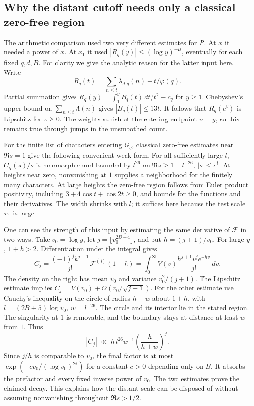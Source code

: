 \subsection{Why the distant cutoff needs only a classical zero-free region}
The arithmetic comparison used two very different estimates for \(R\). At \(x\) it needed a power of \(x\). At \(x_1\) it used \(|R_q(y)|\le(\log y)^{-B}\), eventually for each fixed \(q,d,B\). For clarity we give the analytic reason for the latter input here. Write
\[
  B_q(t)=\sum_{n\le t}\lambda_{d,q}(n)-t/\varphi(q).
\]
Partial summation gives \(R_q(y)=\int_1^y B_q(t)\,dt/t^2-c_q\) for \(y\ge1\). Chebyshev's upper bound on \(\sum_{n\le t}\Lambda(n)\) gives \(|B_q(t)|\le13t\). It follows that \(R_q(e^v)\) is Lipschitz for \(v\ge0\). The weights vanish at the entering endpoint \(n=y\), so this remains true through jumps in the unsmoothed count.

For the finite list of characters entering \(G_q\), classical zero-free estimates near \(\Re s=1\) give the following convenient weak form. For all sufficiently large \(l\), \(G_q(s)/s\) is holomorphic and bounded by \(l^{26}\) on \(\Re s\ge 1-l^{-26}\), \(|s|\le e^l\). At heights near zero, nonvanishing at \(1\) supplies a neighborhood for the finitely many characters. At large heights the zero-free region follows from Euler product positivity, including \(3+4\cos t+\cos 2t\ge0\), and bounds for the functions and their derivatives. The width shrinks with \(l\); it suffices here because the test scale \(x_1\) is large.

One can see the strength of this input by estimating the same derivative of \(\mathcal F\) in two ways. Take \(v_0=\log y\), let \(j=\lfloor v_0^{2B+4}\rfloor\), and put \(h=(j+1)/v_0\). For large \(y\), \(1+h>2\). Differentiation under the integral gives
\[
 C_j=\frac{(-1)^jh^{j+1}}{j!}\mathcal F^{(j)}(1+h)
     =\int_0^\infty V(v)\frac{h^{j+1}v^j e^{-hv}}{j!}\,dv .
\]
The density on the right has mean \(v_0\) and variance \(v_0^2/(j+1)\). The Lipschitz estimate implies \(C_j=V(v_0)+O(v_0/\sqrt{j+1})\). For the other estimate use Cauchy's inequality on the circle of radius \(h+w\) about \(1+h\), with \(l=(2B+5)\log v_0\), \(w=l^{-26}\). The circle and its interior lie in the stated region. The singularity at \(1\) is removable, and the boundary stays at distance at least \(w\) from \(1\). Thus
\[
 |C_j|\ \ll\ h\,l^{26}w^{-1}
      \left(\frac h{h+w}\right)^j .
\]
Since \(j/h\) is comparable to \(v_0\), the final factor is at most \(\exp(-c v_0/(\log v_0)^{26})\) for a constant \(c>0\) depending only on \(B\). It absorbs the prefactor and every fixed inverse power of \(v_0\). The two estimates prove the claimed decay. This explains how the distant scale can be disposed of without assuming nonvanishing throughout \(\Re s>1/2\).

